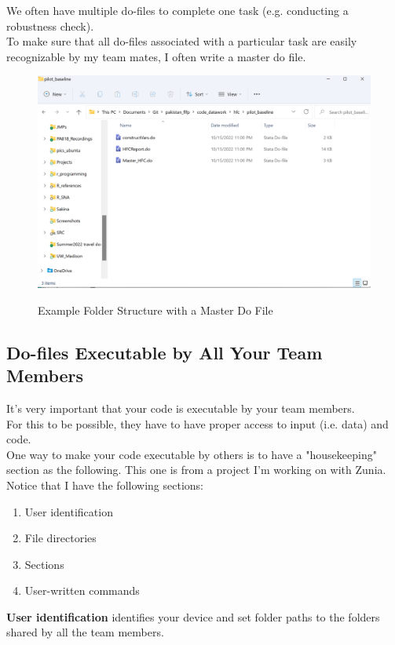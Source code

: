 \documentclass[14pt]{article}
\begin{document}
We often have multiple do-files to complete one task (e.g. conducting a robustness check). \\ 

To make sure that all do-files associated with a particular task are easily recognizable by my team mates, I often write a master do file. \\ 

\begin{figure}[H]
	\centering
	\caption{Example Folder Structure with a Master Do File}
	\includegraphics[width=0.7\linewidth]{example_folder}
	\label{fig:examplefolder}
\end{figure}
	

\subsection{Do-files Executable by All Your Team Members}

It's very important that your code is executable by your team members. \\ 

For this to be possible, they have to have proper access to input (i.e. data) and 
code. \\

One way to make your code executable by others is to have a "housekeeping" section as the following.
This one is from a project I'm working on with Zunia. \\ 

Notice that I have the following sections:
\begin{enumerate}
	\item User identification
	\item File directories
	\item Sections
	\item User-written commands
\end{enumerate}

\textbf{User identification} identifies your device and set folder paths to the folders shared by all the team members. \\
\end{document}
